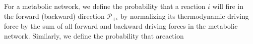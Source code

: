 For a metabolic network, we define the probability that a reaction $i$ will fire in the forward (backward)  direction ${\mathcal P_{+i}}$ by normalizing its thermodynamic driving force by the sum of all forward and backward driving forces in the metabolic network. Similarly, we define the probability that areaction